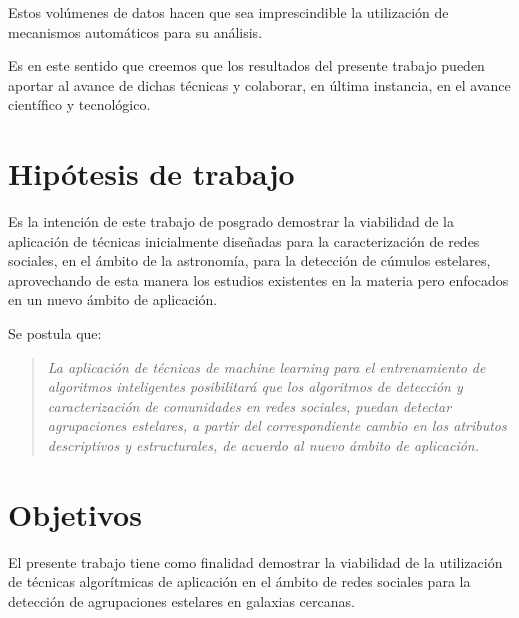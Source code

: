 \documentclass[
	11pt,oneside,a4paper,
	headsepline,footsepline,
	fleqn,
]{memoir}
\begin{document}
Estos volúmenes de datos hacen que sea imprescindible la utilización de mecanismos automáticos para su análisis. %

Es en este sentido que creemos que los resultados del presente trabajo pueden aportar al avance de dichas técnicas y colaborar, en última instancia, en el avance científico y tecnológico.



\section {Hipótesis de trabajo}

Es la intención de este trabajo de posgrado demostrar la viabilidad de la aplicación de técnicas inicialmente diseñadas para la caracterización de redes sociales, en el ámbito de la astronomía, para la detección de cúmulos estelares, aprovechando de esta manera los estudios existentes en la materia pero enfocados en un nuevo ámbito de aplicación.

Se postula que:

\begin{quote}
	\emph{
	La aplicación de técnicas de machine learning para el entrenamiento de algoritmos inteligentes posibilitará que los algoritmos de detección y caracterización de comunidades en redes sociales, puedan detectar agrupaciones estelares, a partir del correspondiente cambio en los atributos descriptivos y estructurales, de acuerdo al nuevo ámbito de aplicación.}
\end{quote}

\section {Objetivos}

El presente trabajo tiene como finalidad demostrar la viabilidad de la utilización de técnicas algorítmicas de aplicación en el ámbito de redes sociales para la detección de agrupaciones estelares en galaxias cercanas.
\end{document}
